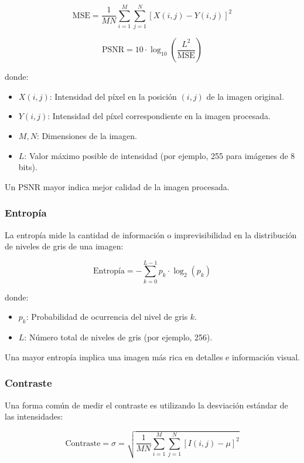 \documentclass[sigchi]{acmart}
\begin{document}
\begin{equation}
\text{MSE} = \frac{1}{MN} \sum_{i=1}^{M} \sum_{j=1}^{N} \left[ X(i,j) - Y(i,j) \right]^2
\end{equation}

\begin{equation}
\text{PSNR} = 10 \cdot \log_{10} \left( \frac{L^2}{\text{MSE}} \right)
\end{equation}

donde:
\begin{itemize}
    \item $X(i,j)$: Intensidad del píxel en la posición $(i,j)$ de la imagen original.
    \item $Y(i,j)$: Intensidad del píxel correspondiente en la imagen procesada.
    \item $M, N$: Dimensiones de la imagen.
    \item $L$: Valor máximo posible de intensidad (por ejemplo, 255 para imágenes de 8 bits).
\end{itemize}

Un PSNR mayor indica mejor calidad de la imagen procesada.

\subsubsection{Entropía}
La entropía mide la cantidad de información o imprevisibilidad en la distribución de niveles de gris de una imagen:

\begin{equation}
\text{Entropía} = - \sum_{k=0}^{L-1} p_k \cdot \log_2(p_k)
\end{equation}

donde:
\begin{itemize}
    \item $p_k$: Probabilidad de ocurrencia del nivel de gris $k$.
    \item $L$: Número total de niveles de gris (por ejemplo, 256).
\end{itemize}

Una mayor entropía implica una imagen más rica en detalles e información visual.

\subsubsection{Contraste}
Una forma común de medir el contraste es utilizando la desviación estándar de las intensidades:

\begin{equation}
\text{Contraste} = \sigma = \sqrt{\frac{1}{MN} \sum_{i=1}^{M} \sum_{j=1}^{N} \left[ I(i,j) - \mu \right]^2}
\end{equation}
\end{document}
